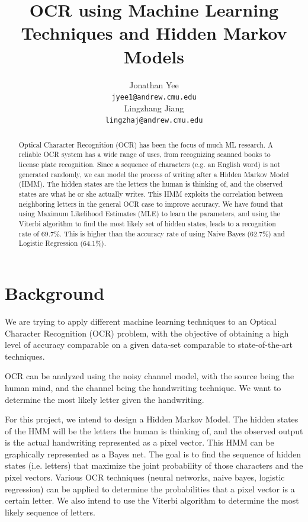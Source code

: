 \documentclass{article} %
\title{OCR using Machine Learning Techniques and Hidden Markov Models}
\author{
Jonathan Yee\\
\texttt{jyee1@andrew.cmu.edu} \\
\And
Lingzhang Jiang \\
\texttt{lingzhaj@andrew.cmu.edu} \\
}
\begin{document}
\newcommand{\mycount}{\mbox{count}}

\maketitle

\begin{abstract}
Optical Character Recognition (OCR) has been the focus of much ML research. A reliable OCR system has a wide range of uses, from recognizing scanned books to license plate recognition. Since a sequence of characters (e.g. an English word) is not generated randomly, we can model the process of writing after a Hidden Markov Model (HMM). The hidden states are the letters the human is thinking of, and the observed states are what he or she actually writes. This HMM exploits the correlation between neighboring letters in the general OCR case to improve accuracy. We have found that using Maximum Likelihood Estimates (MLE) to learn the parameters, and using the Viterbi algorithm to find the most likely set of hidden states, leads to a recognition rate of 69.7\%. This is higher than the accuracy rate of using Naive Bayes (62.7\%) and Logistic Regression (64.1\%).
\end{abstract}

\section{Background}
We are trying to apply different machine learning techniques to an Optical Character Recognition (OCR) problem, with the objective of obtaining a high level of accuracy comparable on a given data-set comparable to state-of-the-art techniques.

OCR can be analyzed using the noisy channel model, with the source being the human mind, and the channel being the handwriting technique. We want to determine the most likely letter given the handwriting. 

For this project, we intend to design a Hidden Markov Model. The hidden states of the HMM will be the letters the human is thinking of, and the observed output is the actual handwriting represented as a pixel vector. This HMM can be graphically represented as a Bayes net. The goal is to find the sequence of hidden states (i.e. letters) that maximize the joint probability of those characters and the pixel vectors. Various OCR techniques (neural networks, naive bayes, logistic regression) can be applied to determine the probabilities that a pixel vector is a certain letter. We also intend to use the Viterbi algorithm to determine the most likely sequence of letters.
\end{document}
